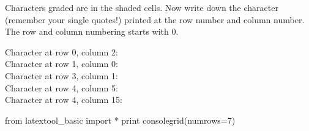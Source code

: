 Characters graded are in the shaded cells.
Now write down the character (remember your single quotes!)
printed at the row number and column number.
The row and column numbering starts with 0.

\nextq Character at row 0, column 2: \\
\nextq Character at row 1, column 0: \\
\nextq Character at row 3, column 1: \answerbox{\textquotesingle\texttt{\ }\textquotesingle}\\
\nextq Character at row 4, column 5: \answerbox{\textquotesingle\textquotedbl\textquotesingle}\\
\nextq Character at row 4, column 15: \\

\begin{python}
from latextool_basic import *
print consolegrid(numrows=7)
\end{python}

\newpage


